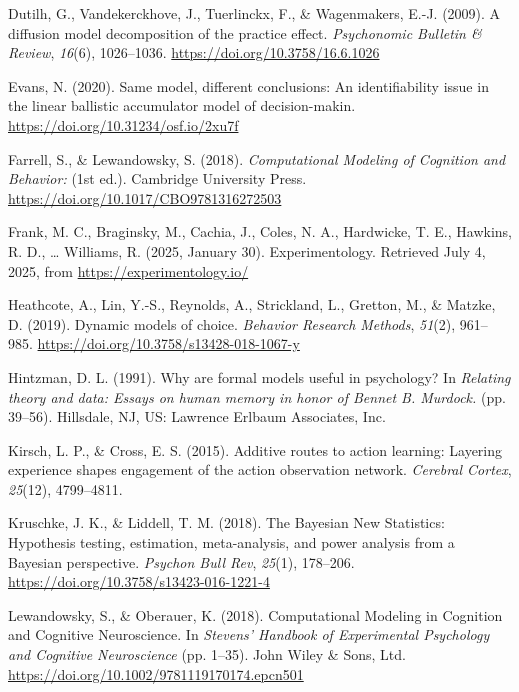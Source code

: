 \documentclass[
  english,
  man, donotrepeattitle,floatsintext]{apa6}
\newlength{\cslhangindent}
\newenvironment{CSLReferences}[2] %
 {\begin{list}{}{%
  \setlength{\itemindent}{0pt}
  \setlength{\leftmargin}{0pt}
  \setlength{\parsep}{0pt}
  \ifodd #1
   \setlength{\leftmargin}{\cslhangindent}
   \setlength{\itemindent}{-1\cslhangindent}
  \fi
  \setlength{\itemsep}{#2\baselineskip}}}
 {\end{list}}
\begin{document}
\begin{CSLReferences}{1}{0}
Dutilh, G., Vandekerckhove, J., Tuerlinckx, F., \& Wagenmakers, E.-J. (2009). A diffusion model decomposition of the practice effect. \emph{Psychonomic Bulletin \& Review}, \emph{16}(6), 1026--1036. \url{https://doi.org/10.3758/16.6.1026}

Evans, N. (2020). Same model, different conclusions: {An} identifiability issue in the linear ballistic accumulator model of decision-makin. \url{https://doi.org/10.31234/osf.io/2xu7f}

Farrell, S., \& Lewandowsky, S. (2018). \emph{Computational {Modeling} of {Cognition} and {Behavior}:} (1st ed.). Cambridge University Press. \url{https://doi.org/10.1017/CBO9781316272503}

Frank, M. C., Braginsky, M., Cachia, J., Coles, N. A., Hardwicke, T. E., Hawkins, R. D., \ldots{} Williams, R. (2025, January 30). Experimentology. Retrieved July 4, 2025, from \url{https://experimentology.io/}

Heathcote, A., Lin, Y.-S., Reynolds, A., Strickland, L., Gretton, M., \& Matzke, D. (2019). Dynamic models of choice. \emph{Behavior Research Methods}, \emph{51}(2), 961--985. \url{https://doi.org/10.3758/s13428-018-1067-y}

Hintzman, D. L. (1991). Why are formal models useful in psychology? In \emph{Relating theory and data: {Essays} on human memory in honor of {Bennet B}. {Murdock}.} (pp. 39--56). Hillsdale, NJ, US: Lawrence Erlbaum Associates, Inc.

Kirsch, L. P., \& Cross, E. S. (2015). Additive routes to action learning: Layering experience shapes engagement of the action observation network. \emph{Cerebral Cortex}, \emph{25}(12), 4799--4811.

Kruschke, J. K., \& Liddell, T. M. (2018). The {Bayesian New Statistics}: {Hypothesis} testing, estimation, meta-analysis, and power analysis from a {Bayesian} perspective. \emph{Psychon Bull Rev}, \emph{25}(1), 178--206. \url{https://doi.org/10.3758/s13423-016-1221-4}

Lewandowsky, S., \& Oberauer, K. (2018). Computational {Modeling} in {Cognition} and {Cognitive Neuroscience}. In \emph{Stevens' {Handbook} of {Experimental Psychology} and {Cognitive Neuroscience}} (pp. 1--35). John Wiley \& Sons, Ltd. \url{https://doi.org/10.1002/9781119170174.epcn501}


\end{CSLReferences}
\end{document}
